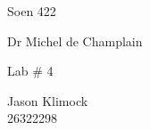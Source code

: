 \begin{titlepage}
	\centering
	{\Large Soen 422\par}
	Dr Michel de Champlain\\
	
	\vspace{50mm}
	{\Large Lab \#  4 \par}
	\vspace{100mm}
	Jason Klimock\\
	26322298
\end{titlepage}
